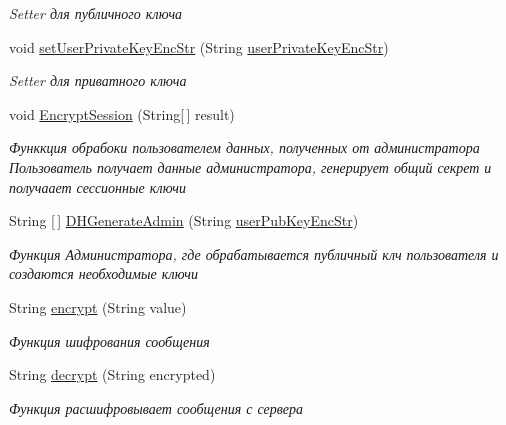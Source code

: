 \begin{DoxyCompactItemize}
\begin{DoxyCompactList}\small\item\em Setter для публичного ключа \end{DoxyCompactList}\item 
void \mbox{\hyperlink{classcom_1_1example_1_1firebasechat_1_1_user_a4cef7096288a776f77934c2cd8f84a72}{set\+User\+Private\+Key\+Enc\+Str}} (String \mbox{\hyperlink{classcom_1_1example_1_1firebasechat_1_1_user_a210e28a59a8e53a7deb7e18027875173}{user\+Private\+Key\+Enc\+Str}})
\begin{DoxyCompactList}\small\item\em Setter для приватного ключа \end{DoxyCompactList}\item 
void \mbox{\hyperlink{classcom_1_1example_1_1firebasechat_1_1_user_a9b6df56e1fc82db7c8d24e81d2250801}{Encrypt\+Session}} (String\mbox{[}$\,$\mbox{]} result)
\begin{DoxyCompactList}\small\item\em Функкция обрабоки пользователем данных, полученных от администратора Пользователь получает данные администратора, генерирует общий секрет и получаает сессионные ключи \end{DoxyCompactList}\item 
String \mbox{[}$\,$\mbox{]} \mbox{\hyperlink{classcom_1_1example_1_1firebasechat_1_1_user_a67d1a7cbc2c9380c36a61503eb44b30f}{D\+H\+Generate\+Admin}} (String \mbox{\hyperlink{classcom_1_1example_1_1firebasechat_1_1_user_a92f14106f35b17ca627b7a5ca0dd3d02}{user\+Pub\+Key\+Enc\+Str}})
\begin{DoxyCompactList}\small\item\em Функция Администратора, где обрабатывается публичный клч пользователя и создаются необходимые ключи \end{DoxyCompactList}\item 
String \mbox{\hyperlink{classcom_1_1example_1_1firebasechat_1_1_user_a7f85ab138092dde2b7f24fc263aaa8ae}{encrypt}} (String value)
\begin{DoxyCompactList}\small\item\em Функция шифрования сообщения \end{DoxyCompactList}\item 
String \mbox{\hyperlink{classcom_1_1example_1_1firebasechat_1_1_user_ac47b81720a3550b1856695932fec607a}{decrypt}} (String encrypted)
\begin{DoxyCompactList}\small\item\em Функция расшифровывает сообщения с сервера \end{DoxyCompactList}\end{DoxyCompactItemize}
